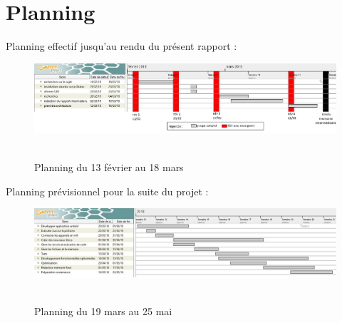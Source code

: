 \documentclass[12pt,francais]{report}
\begin{document}
\chapter*{Planning}

Planning effectif jusqu'au rendu du présent rapport :\\
\begin{figure}[!h]
\begin{addmargin}[-7em]{1em}
\includegraphics[scale=0.6]{./images/intermediaireEffectif.jpg}~\\[1.5cm]
\caption{Planning du 13 février au 18 mars}
\end{addmargin}
\end{figure}

\newpage
Planning prévisionnel pour la suite du projet :\\
\begin{figure}[!h]
\begin{addmargin}[-8em]{1em}
\includegraphics[scale=0.6]{./images/previsionnel.jpg}~\\[1.5cm]
\caption{Planning du 19 mars au 25 mai}
\end{addmargin}
\end{figure}



\end{document}
